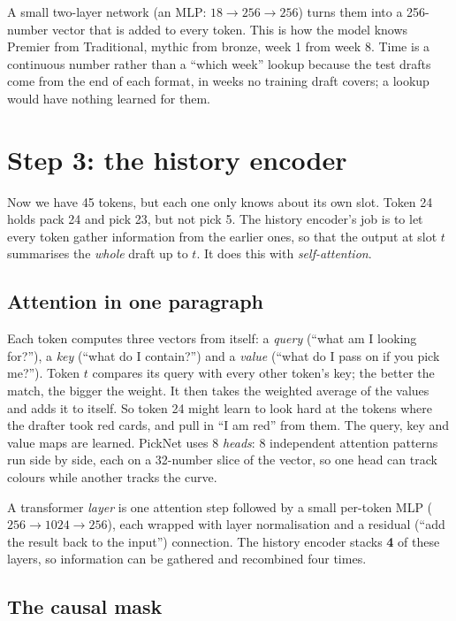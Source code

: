 \documentclass[11pt,letterpaper]{article}
\begin{document}
A small two-layer network (an MLP: $18\to256\to256$) turns them into a 256-number vector that is added to
every token. This is how the model knows Premier from Traditional, mythic from bronze, week 1 from
week 8. Time is a continuous number rather than a ``which week'' lookup because the test drafts come from
the end of each format, in weeks no training draft covers; a lookup would have nothing learned for them.

\section{Step 3: the history encoder}\label{sec:causal}

Now we have 45 tokens, but each one only knows about its own slot. Token 24 holds pack 24 and pick 23, but
not pick 5. The history encoder's job is to let every token gather information from the earlier ones, so
that the output at slot $t$ summarises the \emph{whole} draft up to $t$. It does this with
\emph{self-attention}.

\subsection{Attention in one paragraph}

Each token computes three vectors from itself: a \emph{query} (``what am I looking for?''), a \emph{key}
(``what do I contain?'') and a \emph{value} (``what do I pass on if you pick me?''). Token $t$ compares its
query with every other token's key; the better the match, the bigger the weight. It then takes the
weighted average of the values and adds it to itself. So token 24 might learn to look hard at the tokens
where the drafter took red cards, and pull in ``I am red'' from them. The query, key and value maps are
learned. PickNet uses 8 \emph{heads}: 8 independent attention patterns run side by side, each on a 32-number
slice of the vector, so one head can track colours while another tracks the curve.

A transformer \emph{layer} is one attention step followed by a small per-token MLP ($256\to1024\to256$),
each wrapped with layer normalisation and a residual (``add the result back to the input'') connection.
The history encoder stacks \textbf{4} of these layers, so information can be gathered and recombined four
times.

\subsection{The causal mask}
\end{document}
